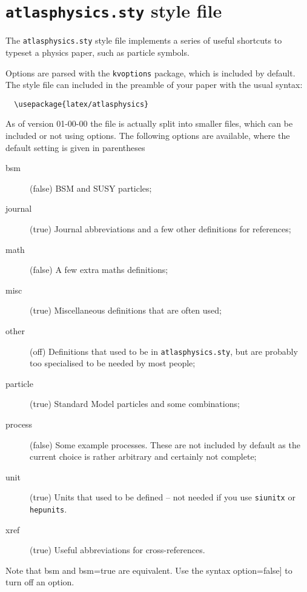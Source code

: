 \documentclass[koma,UKenglish]{latex/atlasdoc}
\author{Ian C. Brock}
\affil{University of Bonn}
\newcommand{\File}[1]{\texttt{#1}\xspace}
\newcommand{\Option}[1]{\textsf{#1}\xspace}
\newcommand{\Package}[1]{\texttt{#1}\xspace}
\begin{document}
\tableofcontents

\section{\File{atlasphysics.sty} style file}
\label{sec:atlasphysics}

The \File{atlasphysics.sty} style file implements a series of useful
shortcuts to typeset a physics paper, such as particle
symbols.

Options are parsed with the \Package{kvoptions} package, which is included by default.
The style file can included in the preamble of your paper with the usual
syntax:
%
\begin{verbatim}
  \usepackage{latex/atlasphysics}
\end{verbatim}
%
As of version 01-00-00 the file is actually split into smaller files,
which can be included or not using options.
The following options are available, where the default setting is given in parentheses
\begin{description}
\item[bsm](false) BSM and SUSY particles;
\item[journal](true) Journal abbreviations and a few other definitions for references;
\item[math](false) A few extra maths definitions;
\item[misc](true) Miscellaneous definitions that are often used;
\item[other](off) Definitions that used to be in \File{atlasphysics.sty}, 
	but are probably too specialised to be needed by most people;
\item[particle](true) Standard Model particles and some combinations;
\item[process](false) Some example processes. 
	These are not included by default as the current choice is rather arbitrary
	and certainly not complete;
\item[unit](true) Units that used to be defined -- not needed if you use \Package{siunitx} or \Package{hepunits}.
\item[xref](true) Useful abbreviations for cross-references.
\end{description}
Note that \Option{bsm} and \Option{bsm=true} are equivalent.
Use the syntax \Option{option=false]} to turn off an option.
\end{document}
